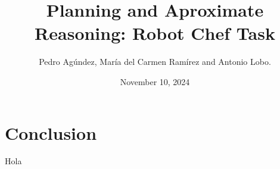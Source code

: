 \documentclass{article}
\title{Planning and Aproximate Reasoning: Robot Chef Task}
\author{
	Pedro Agúndez, María del Carmen Ramírez and Antonio Lobo.
}
\date{November 10, 2024}
\begin{document}
	
	\maketitle

 

 


\section{Conclusion}
Hola\cite{key}



\end{document}
